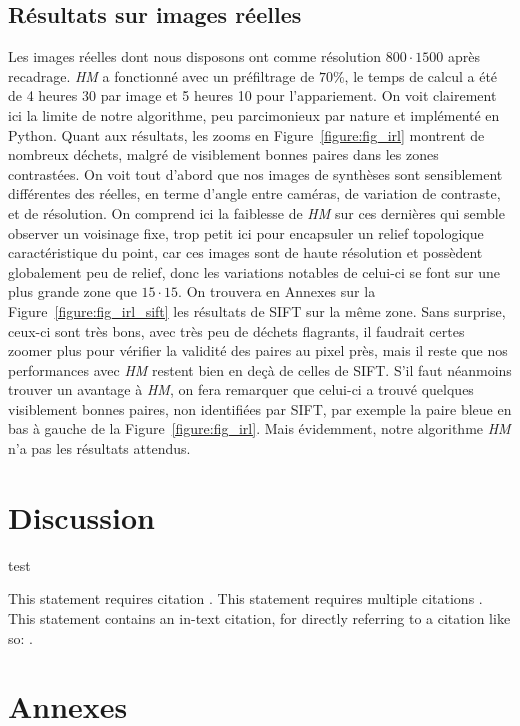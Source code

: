 \documentclass[
	a4paper, %
	10pt, %
	unnumberedsections, %
	twoside, %
]{LTJournalArticle}
\begin{document}
\subsection{Résultats sur images réelles}
Les images réelles dont nous disposons ont comme résolution $800 \cdot 1500$ après recadrage. \textit{HM} a fonctionné
avec un préfiltrage de $70 \%$, le temps de calcul a été de 4 heures 30 par image et 5 heures 10 pour l'appariement.
On voit clairement ici la limite de notre algorithme, peu parcimonieux par nature et implémenté en Python.
Quant aux résultats, les zooms en Figure~\ref{figure:fig_irl} montrent de nombreux déchets, malgré de visiblement
bonnes paires dans les zones contrastées.
On voit tout d'abord que nos images de synthèses sont sensiblement différentes des réelles,
en terme d'angle entre caméras, de variation de contraste, et de résolution.
On comprend ici la faiblesse de \textit{HM} sur ces dernières qui semble observer un voisinage fixe,
trop petit ici pour encapsuler un relief topologique caractéristique du point,
car ces images sont de haute résolution et possèdent globalement peu de relief, donc les
variations notables de celui-ci se font sur une plus grande zone que $15 \cdot 15$.
On trouvera en Annexes sur la Figure~\ref{figure:fig_irl_sift} les résultats de SIFT sur la même zone.
Sans surprise, ceux-ci sont très bons, avec très peu de déchets flagrants, il faudrait certes zoomer plus
pour vérifier la validité des paires au pixel près, mais il reste que nos performances avec \textit{HM}
restent bien en deçà de celles de SIFT. S'il faut néanmoins trouver un avantage à \textit{HM}, on fera
remarquer que celui-ci a trouvé quelques visiblement bonnes paires, non identifiées par SIFT, par
exemple la paire bleue en bas à gauche de la Figure~\ref{figure:fig_irl}.
Mais évidemment, notre algorithme \textit{HM} n'a pas les résultats attendus.


\clearpage

\section{Discussion}

test

This statement requires citation \autocite{Smith:2023qr}. This statement requires multiple citations \autocite{Smith:2023qr, Smith:2024jd}. This statement contains an in-text citation, for directly referring to a citation like so: \textcite{Smith:2024jd}.



\section{Annexes}
\end{document}
